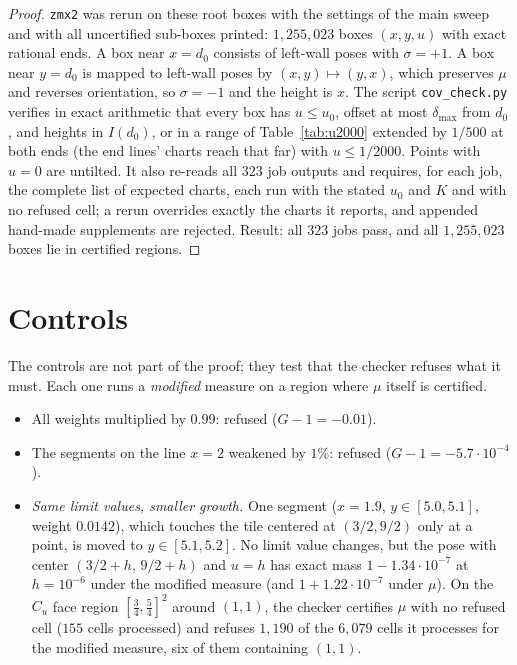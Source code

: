 \documentclass[11pt]{amsart}
\theoremstyle{definition}
\theoremstyle{remark}
\begin{document}
\begin{proof}
\texttt{zmx2} was rerun on these root boxes with the settings of the main sweep and with all uncertified sub-boxes
printed: $1{,}255{,}023$ boxes $(x,y,u)$ with exact rational ends. A box near $x=d_0$ consists of left-wall poses with
$\sigma=+1$. A box near $y=d_0$ is mapped to left-wall poses by $(x,y)\mapsto(y,x)$, which preserves $\mu$ and
reverses orientation, so $\sigma=-1$ and the height is $x$. The script \texttt{cov\_check.py} verifies in exact
arithmetic that every box has $u\le u_0$, offset at most $\delta_{\max}$ from $d_0$, and heights in $I(d_0)$, or in a
range of Table~\ref{tab:u2000} extended by $1/500$ at both ends (the end lines' charts reach that far) with
$u\le1/2000$. Points with $u=0$ are untilted. It also re-reads all $323$ job outputs and requires, for each job, the
complete list of expected charts, each run with the stated $u_0$ and $K$ and with no refused cell; a rerun overrides
exactly the charts it reports, and appended hand-made supplements are rejected. Result: all $323$ jobs pass, and all
$1{,}255{,}023$ boxes lie in certified regions.
\end{proof}

\section{Controls}\label{sec:controls}

The controls are not part of the proof; they test that the checker refuses what it must. Each one runs a
\emph{modified} measure on a region where $\mu$ itself is certified.
\begin{itemize}
\item All weights multiplied by $0.99$: refused ($G-1=-0.01$).
\item The segments on the line $x=2$ weakened by $1\%$: refused ($G-1=-5.7\cdot10^{-4}$).
\item \emph{Same limit values, smaller growth.} One segment ($x=1.9$, $y\in[5.0,5.1]$, weight $0.0142$), which touches
the tile centered at $(3/2,9/2)$ only at a point, is moved to $y\in[5.1,5.2]$. No limit value changes, but the pose
with center $(3/2+h,\,9/2+h)$ and $u=h$ has exact mass $1-1.34\cdot10^{-7}$ at $h=10^{-6}$ under the modified measure
(and $1+1.22\cdot10^{-7}$ under $\mu$). On the $C_u$ face region $[\frac34,\frac54]^2$ around $(1,1)$, the checker
certifies $\mu$ with no refused cell ($155$ cells processed) and refuses $1{,}190$ of the $6{,}079$ cells it processes
for the modified measure, six of them containing $(1,1)$.
\end{itemize}
\end{document}
